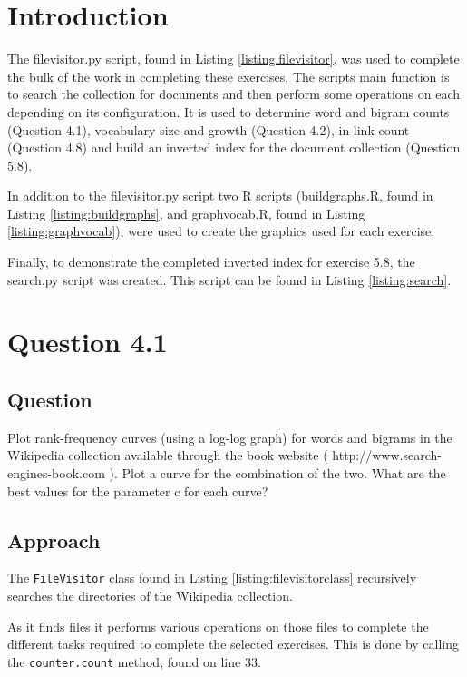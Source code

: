 \section{Introduction}
The filevisitor.py script, found in Listing \ref{listing:filevisitor}, was used to complete the bulk of the work in completing these exercises.  The scripts main function is to search the collection for documents and then perform some operations on each depending on its configuration.  It is used to determine word and bigram counts (Question 4.1), vocabulary size and growth (Question 4.2), in-link count (Question 4.8) and build an inverted index for the document collection (Question 5.8).

In addition to the filevisitor.py script two R scripts (buildgraphs.R, found in Listing \ref{listing:buildgraphs}, and graphvocab.R, found in Listing \ref{listing:graphvocab}), were used to create the graphics used for each exercise.

Finally, to demonstrate the completed inverted index for exercise 5.8, the search.py script was created.  This script can be found in Listing \ref{listing:search}.

\section{Question 4.1}

\subsection{Question}
Plot rank-frequency curves (using a log-log graph) for words and bigrams in the Wikipedia collection available through the book website ( http://www.search-engines-book.com ). Plot a curve for the combination of the two. What are the best values for the parameter c for each curve?

\subsection{Approach}
The \texttt{FileVisitor} class found in Listing \ref{listing:filevisitorclass} recursively searches the directories of the Wikipedia collection.



As it finds files it performs various operations on those files to complete the different tasks required to complete the selected exercises.  This is done by calling the \texttt{counter.count} method, found on line 33.

